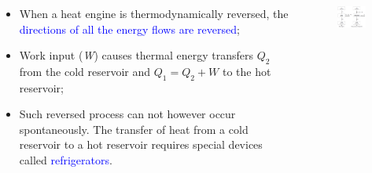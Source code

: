 \documentclass[10pt,compress]{beamer}
\begin{document}
\begin{frame}
 \frametitle{}
  \begin{columns}
   \begin{column}[c]{0.45\linewidth}
    \begin{itemize} 
     \item <1-> When a heat engine is thermodynamically reversed, the \textcolor{blue}{directions of all the energy flows are reversed};
     \item <2-> Work input ({\it W}) causes thermal energy transfers $Q_{2}$ from the cold reservoir and $Q_{1}=Q_{2}+W$ to the hot reservoir; 
     \item <3-> Such reversed process can not however occur spontaneously. The transfer of heat from a cold reservoir to a hot reservoir requires special devices called \textcolor{blue}{refrigerators}.
    \end{itemize}
   \end{column}
   \begin{column}[c]{0.55\linewidth}
    \begin{figure}%
     \begin{center}
      \includegraphics[width=6.5cm,clip]{./Pics/Overview_Refrig1}
     \end{center}
    \end{figure}  
   \end{column}  
  \end{columns}
\end{frame}
\end{document}
